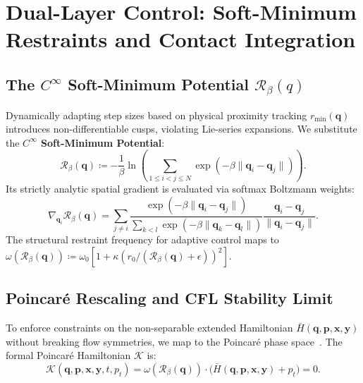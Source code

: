 \documentclass[11pt,a4paper,reqno]{article}
\theoremstyle{plain}
\theoremstyle{definition}
\theoremstyle{remark}
\numberwithin{equation}{section}
\begin{document}
\bigskip

\section{Dual-Layer Control: Soft-Minimum Restraints and Contact Integration}
\label{sec:contact_control}

\subsection{The \texorpdfstring{$C^\infty$}{C-infinity} Soft-Minimum Potential \texorpdfstring{$\mathcal{R}_\beta(q)$}{R\_beta(q)}}
Dynamically adapting step sizes based on physical proximity tracking $r_{\min}(\bm{q})$ introduces non-differentiable cusps, violating Lie-series expansions. We substitute the \textbf{$C^\infty$ Soft-Minimum Potential}:
\begin{equation}
\mathcal{R}_\beta(\bm{q}) \coloneqq -\frac{1}{\beta} \ln \left( \sum_{1 \le i < j \le N} \exp\left( -\beta \lVert\bm{q}_i - \bm{q}_j\rVert \right) \right).
\end{equation}
Its strictly analytic spatial gradient is evaluated via softmax Boltzmann weights:
\begin{equation}
\nabla_{\bm{q}_i} \mathcal{R}_\beta(\bm{q}) = \sum_{j \neq i} \frac{\exp\left(-\beta \lVert\bm{q}_i - \bm{q}_j\rVert\right)}{\sum_{k < l} \exp\left(-\beta \lVert\bm{q}_k - \bm{q}_l\rVert\right)} \frac{\bm{q}_i - \bm{q}_j}{\lVert\bm{q}_i - \bm{q}_j\rVert}.
\end{equation}
The structural restraint frequency for adaptive control maps to $\omega(\mathcal{R}_\beta(\bm{q})) \coloneqq \omega_0 [ 1 + \kappa ( r_0 / (\mathcal{R}_\beta(\bm{q}) + \epsilon) )^2 ]$.

\subsection{Poincaré Rescaling and CFL Stability Limit}
To enforce constraints on the non-separable extended Hamiltonian $\bar{H}(\bm{q}, \bm{p}, \bm{x}, \bm{y})$ without breaking flow symmetries, we map to the Poincaré phase space~\cite{Tao2016}. The formal Poincaré Hamiltonian $\mathcal{K}$ is:
\begin{equation}
\mathcal{K}(\bm{q}, \bm{p}, \bm{x}, \bm{y}, t, p_t) = \omega(\mathcal{R}_\beta(\bm{q})) \cdot \Big( \bar{H}(\bm{q}, \bm{p}, \bm{x}, \bm{y}) + p_t \Big) = 0.
\end{equation}
\end{document}
